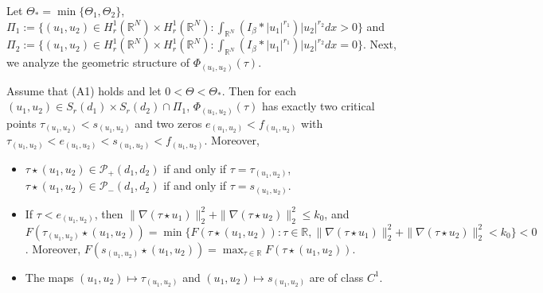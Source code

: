 \documentclass[reqno]{amsart}
\begin{document}
Let $\Theta_*=\min\{\Theta_1,\Theta_2\}$,
$\varPi_1:=\{(u_1,u_2)\in H_r^1(\mathbb{R}^N)\times 
H_r^1(\mathbb{R}^N):\int_{\mathbb{R}^N}(I_\beta
\ast|u_1|^{r_1})|u_2|^{r_2}dx>0\}$ and 
$\varPi_2:=\{(u_1,u_2)\in H_r^1(\mathbb{R}^N)\times H_r^1(\mathbb{R}^N):
\int_{\mathbb{R}^N}(I_\beta \ast|u_1|^{r_1})|u_2|^{r_2}dx=0\}$. 
Next, we analyze the geometric structure of $\Phi_{(u_1,u_2)}(\tau)$.

\begin{lemma}\label{threep}
Assume that {\rm (A1)} holds and let $0<\Theta<\Theta_*$. 
Then for each $(u_1,u_2)\in S_r(d_1)\times S_r(d_2)\cap\varPi_1$, 
$\Phi_{(u_1,u_2)}(\tau)$
has exactly two critical points $\tau_{(u_1,u_2)}<s_{(u_1,u_2)}$ and two zeros
 $e_{(u_1,u_2)}<f_{(u_1,u_2)}$ with $\tau_{(u_1,u_2)}<e_{(u_1,u_2)}<s_{(u_1,u_2)}<
f_{(u_1,u_2)}$. Moreover,
\begin{itemize}
\item[(i)] $\tau\star(u_1,u_2)\in\mathcal{P}_+(d_1,d_2)$ if and only if 
$\tau=\tau_{(u_1,u_2)}$, $\tau\star(u_1,u_2)\in\mathcal{P}_-(d_1,d_2)$ if and only if 
$\tau=s_{(u_1,u_2)}$.

\item[(ii)] If $\tau<e_{(u_1,u_2)}$, then 
$\| \nabla(\tau\star u_1)\|_2^2+\| \nabla(\tau\star u_2)\|_2^2\leq k_0$, and
$F(\tau_{(u_1,u_2)}\star(u_1,u_2))=\min\{F(\tau\star(u_1,u_2)):
\tau\in\mathbb{R},\| \nabla(\tau\star u_1)\|_2^2+\|
\nabla(\tau\star u_2)\|_2^2<k_0\}<0$. Moreover, 
$F(s_{(u_1,u_2)}\star(u_1,u_2))=\max_{\tau\in\mathbb{R}}F(\tau\star(u_1,u_2))$.

\item[(iii)] The maps $(u_1,u_2)\mapsto \tau_{(u_1,u_2)}$ and 
$(u_1,u_2)\mapsto s_{(u_1,u_2)}$ are of class $C^1$.
\end{itemize}
\end{lemma}
\end{document}
